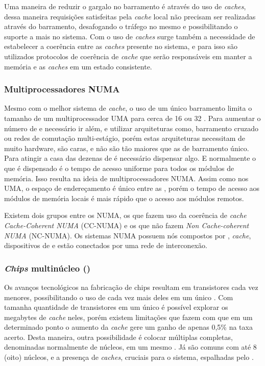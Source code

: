Uma maneira de reduzir o gargalo no barramento é através do uso de \textit{caches}, dessa maneira requisições satisfeitas pela \textit{cache} local não precisam ser realizadas através do barramento, desafogando o tráfego no mesmo e possibilitando o suporte a mais \cpus no sistema. Com o uso de \textit{caches} surge também a necessidade de estabelecer a coerência entre as \textit{caches} presente no sistema, e para isso são utilizados protocolos de coerência de \textit{cache} que serão responsáveis em manter a memória e as \textit{caches} em um estado consistente.

\subsubsection{Multiprocessadores NUMA}
\label{subsubsec:hw-multiprocessadores-numa}

Mesmo com o melhor sistema de \textit{cache}, o uso de um único barramento limita o tamanho de um multiprocessador UMA para cerca de 16 ou 32 \cpus \cite{Tanenbaum:2014:MOS:2655363}. Para aumentar o número de \cpus e necessário ir além, e utilizar arquiteturas como, barramento cruzado ou redes de comutação multi-estágio, porém estas arquiteturas necessitam de muito hardware, são caras, e não são tão maiores que as de barramento único. Para atingir a casa das dezenas de \cpus é necessário dispensar algo. E normalmente o que é dispensado é o tempo de acesso uniforme para todos os módulos de memória. Isso resulta na ideia de multiprocessadores NUMA. Assim como nos UMA, o espaço de endereçamento é único entre as \cpus, porém o tempo de acesso aos módulos de memória locais é mais rápido que o acesso aos módulos remotos.

Existem dois grupos entre os NUMA, os que fazem uso da coerência de \textit{cache} \textit{Cache-Coherent NUMA} (CC-NUMA) e os que não fazem \textit{Non Cache-coherent NUMA} (NC-NUMA). Os sistemas NUMA possuem nós compostos por \cpu, \textit{cache}, dispositivos de \io e estão conectados por uma rede de interconexão.

\subsubsection{\textit{Chips} multinúcleo (\multicore)}
\label{subsubsec:chips-multinucleo}

Os avanços tecnológicos na fabricação de chips resultam em transistores cada vez menores, possibilitando o uso de cada vez mais deles em um único \chip. Com tamanha quantidade de transistores em um único \chip é possível explorar os megabytes de \textit{cache} neles, porém existem limitações que fazem com que em um determinado ponto o aumento da \textit{cache} gere um ganho de apenas 0,5\% na taxa acerto. Desta maneira, outra possibilidade é colocar múltiplas \cpus completas, denominadas normalmente de núcleos, em um mesmo \chip. Já são comuns \chips com até 8 (oito) núcleos, e a presença de \textit{caches}, cruciais para o sistema, espalhadas pelo \chip.

